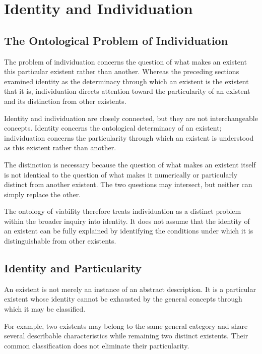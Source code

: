 
\section{Identity and Individuation}
\label{sec:identity-and-individuation}

\subsection{The Ontological Problem of Individuation}

The problem of individuation concerns the question of what makes an existent this particular existent rather than another. Whereas the preceding sections examined identity as the determinacy through which an existent is the existent that it is, individuation directs attention toward the particularity of an existent and its distinction from other existents.

Identity and individuation are closely connected, but they are not interchangeable concepts. Identity concerns the ontological determinacy of an existent; individuation concerns the particularity through which an existent is understood as this existent rather than another.

The distinction is necessary because the question of what makes an existent itself is not identical to the question of what makes it numerically or particularly distinct from another existent. The two questions may intersect, but neither can simply replace the other.

The ontology of viability therefore treats individuation as a distinct problem within the broader inquiry into identity. It does not assume that the identity of an existent can be fully explained by identifying the conditions under which it is distinguishable from other existents.

\subsection{Identity and Particularity}

An existent is not merely an instance of an abstract description. It is a particular existent whose identity cannot be exhausted by the general concepts through which it may be classified.

For example, two existents may belong to the same general category and share several describable characteristics while remaining two distinct existents. Their common classification does not eliminate their particularity.

